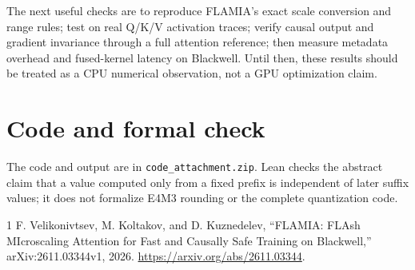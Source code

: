 \documentclass[10pt,twocolumn]{article}
\begin{document}
The next useful checks are to reproduce FLAMIA's exact scale conversion and range rules; test on real Q/K/V activation traces; verify causal output and gradient invariance through a full attention reference; then measure metadata overhead and fused-kernel latency on Blackwell. Until then, these results should be treated as a CPU numerical observation, not a GPU optimization claim.

\section{Code and formal check}
The code and output are in \texttt{code\_attachment.zip}. Lean checks the abstract claim that a value computed only from a fixed prefix is independent of later suffix values; it does not formalize E4M3 rounding or the complete quantization code.

\begin{thebibliography}{1}
F. Velikonivtsev, M. Koltakov, and D. Kuznedelev, ``FLAMIA: FLAsh MIcroscaling Attention for Fast and Causally Safe Training on Blackwell,'' arXiv:2611.03344v1, 2026. \url{https://arxiv.org/abs/2611.03344}.
\end{thebibliography}
\end{document}
